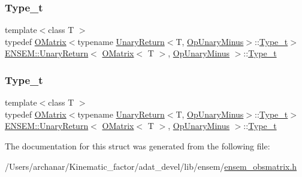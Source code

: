\subsubsection{\texorpdfstring{Type\_t}{Type\_t}\hspace{0.1cm}{\footnotesize\ttfamily [1/2]}}
{\footnotesize\ttfamily template$<$class T $>$ \\
typedef \mbox{\hyperlink{classENSEM_1_1OMatrix}{O\+Matrix}}$<$typename \mbox{\hyperlink{structENSEM_1_1UnaryReturn}{Unary\+Return}}$<$T, \mbox{\hyperlink{structENSEM_1_1OpUnaryMinus}{Op\+Unary\+Minus}}$>$\+::\mbox{\hyperlink{structENSEM_1_1UnaryReturn_3_01OMatrix_3_01T_01_4_00_01OpUnaryMinus_01_4_a7ee85b64d167dda62c67b1c0e963de96}{Type\+\_\+t}}$>$ \mbox{\hyperlink{structENSEM_1_1UnaryReturn}{E\+N\+S\+E\+M\+::\+Unary\+Return}}$<$ \mbox{\hyperlink{classENSEM_1_1OMatrix}{O\+Matrix}}$<$ T $>$, \mbox{\hyperlink{structENSEM_1_1OpUnaryMinus}{Op\+Unary\+Minus}} $>$\+::\mbox{\hyperlink{structENSEM_1_1UnaryReturn_3_01OMatrix_3_01T_01_4_00_01OpUnaryMinus_01_4_a7ee85b64d167dda62c67b1c0e963de96}{Type\+\_\+t}}}

\mbox{\label{structENSEM_1_1UnaryReturn_3_01OMatrix_3_01T_01_4_00_01OpUnaryMinus_01_4_a7ee85b64d167dda62c67b1c0e963de96}} 
\subsubsection{\texorpdfstring{Type\_t}{Type\_t}\hspace{0.1cm}{\footnotesize\ttfamily [2/2]}}
{\footnotesize\ttfamily template$<$class T $>$ \\
typedef \mbox{\hyperlink{classENSEM_1_1OMatrix}{O\+Matrix}}$<$typename \mbox{\hyperlink{structENSEM_1_1UnaryReturn}{Unary\+Return}}$<$T, \mbox{\hyperlink{structENSEM_1_1OpUnaryMinus}{Op\+Unary\+Minus}}$>$\+::\mbox{\hyperlink{structENSEM_1_1UnaryReturn_3_01OMatrix_3_01T_01_4_00_01OpUnaryMinus_01_4_a7ee85b64d167dda62c67b1c0e963de96}{Type\+\_\+t}}$>$ \mbox{\hyperlink{structENSEM_1_1UnaryReturn}{E\+N\+S\+E\+M\+::\+Unary\+Return}}$<$ \mbox{\hyperlink{classENSEM_1_1OMatrix}{O\+Matrix}}$<$ T $>$, \mbox{\hyperlink{structENSEM_1_1OpUnaryMinus}{Op\+Unary\+Minus}} $>$\+::\mbox{\hyperlink{structENSEM_1_1UnaryReturn_3_01OMatrix_3_01T_01_4_00_01OpUnaryMinus_01_4_a7ee85b64d167dda62c67b1c0e963de96}{Type\+\_\+t}}}



The documentation for this struct was generated from the following file\+:\begin{DoxyCompactItemize}
\item 
/\+Users/archanar/\+Kinematic\+\_\+factor/adat\+\_\+devel/lib/ensem/\mbox{\hyperlink{lib_2ensem_2ensem__obsmatrix_8h}{ensem\+\_\+obsmatrix.\+h}}\end{DoxyCompactItemize}
